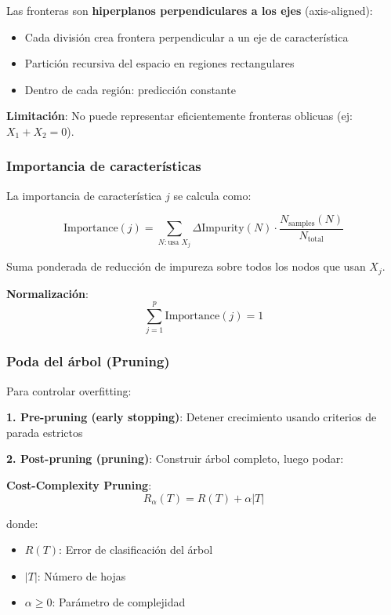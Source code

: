 \documentclass[
  doc,
  floatsintext,
  longtable,
  a4paper,
  nolmodern,
  notxfonts,
  notimes,
  12pt,
  colorlinks=true,linkcolor=blue,citecolor=blue,urlcolor=blue]{apa7}
\providecommand{\tightlist}{%
  \setlength{\itemsep}{0pt}\setlength{\parskip}{0pt}}
\begin{document}
Las fronteras son \textbf{hiperplanos perpendiculares a los ejes}
(axis-aligned):

\begin{itemize}
\tightlist
\item
  Cada división crea frontera perpendicular a un eje de característica
\item
  Partición recursiva del espacio en regiones rectangulares
\item
  Dentro de cada región: predicción constante
\end{itemize}

\textbf{Limitación}: No puede representar eficientemente fronteras
oblicuas (ej: \(X_1 + X_2 = 0\)).

\subsubsection{Importancia de
características}\label{importancia-de-caracteruxedsticas}

La importancia de característica \(j\) se calcula como:

\[
\text{Importance}(j) = \sum_{N : \text{usa } X_j} \Delta \text{Impurity}(N) \cdot \frac{N_{\text{samples}}(N)}{N_{\text{total}}}
\]

Suma ponderada de reducción de impureza sobre todos los nodos que usan
\(X_j\).

\textbf{Normalización}: \[
\sum_{j=1}^{p} \text{Importance}(j) = 1
\]

\subsubsection{Poda del árbol
(Pruning)}\label{poda-del-uxe1rbol-pruning}

Para controlar overfitting:

\textbf{1. Pre-pruning (early stopping)}: Detener crecimiento usando
criterios de parada estrictos

\textbf{2. Post-pruning (pruning)}: Construir árbol completo, luego
podar:

\textbf{Cost-Complexity Pruning}: \[
R_\alpha(T) = R(T) + \alpha |T|
\]

donde:

\begin{itemize}
\tightlist
\item
  \(R(T)\): Error de clasificación del árbol
\item
  \(|T|\): Número de hojas
\item
  \(\alpha \geq 0\): Parámetro de complejidad
\end{itemize}
\end{document}
